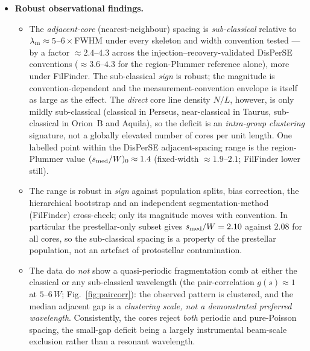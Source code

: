 \documentclass[usenatbib,twoside,twocolumn]{mnras}
\begin{document}
\begin{itemize}
    \item \textbf{Robust observational findings.}
    \begin{itemize}
        \item The \emph{adjacent-core} (nearest-neighbour) spacing is \emph{sub-classical} relative to $\lambda_{\rm m}\approx5$--$6\times$FWHM under every skeleton and width convention tested --- by a factor $\approx2.4$--$4.3$ across the injection--recovery-validated DisPerSE conventions ($\approx3.6$--$4.3$ for the region-Plummer reference alone), more under FilFinder. The sub-classical \emph{sign} is robust; the magnitude is convention-dependent and the measurement-convention envelope is itself as large as the effect. The \emph{direct} core line density $N/L$, however, is only mildly sub-classical (classical in Perseus, near-classical in Taurus, sub-classical in Orion~B and Aquila), so the deficit is an \emph{intra-group clustering} signature, not a globally elevated number of cores per unit length. One labelled point within the DisPerSE adjacent-spacing range is the region-Plummer value $(s_{\rm med}/W)_0\approx1.4$ (fixed-width $\approx1.9$--$2.1$; FilFinder lower still).
        \item The range is robust in \emph{sign} against population splits, bias correction, the hierarchical bootstrap and an independent segmentation-method (FilFinder) cross-check; only its magnitude moves with convention. In particular the prestellar-only subset gives $s_{\rm med}/W=2.10$ against $2.08$ for all cores, so the sub-classical spacing is a property of the prestellar population, not an artefact of protostellar contamination.
        \item The data do \emph{not} show a quasi-periodic fragmentation comb at either the classical or any sub-classical wavelength (the pair-correlation $g(s)\approx1$ at $5$--$6\,W$; Fig.~\ref{fig:paircorr}): the observed pattern is clustered, and the median adjacent gap is a \emph{clustering scale, not a demonstrated preferred wavelength}. Consistently, the cores reject \emph{both} periodic and pure-Poisson spacing, the small-gap deficit being a largely instrumental beam-scale exclusion rather than a resonant wavelength.
    \end{itemize}


\end{itemize}
\end{document}
